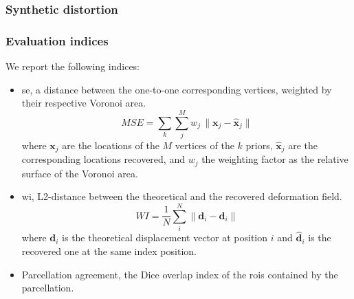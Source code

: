 \subsubsection{Synthetic distortion}
\label{sec:distortion}



\subsubsection{Evaluation indices} %
\label{sec:evaluation}
We report the following indices:
  \begin{itemize}
  \item \gls{se}, a distance between the one-to-one corresponding
    vertices, weighted by their respective Voronoi area.
    \begin{equation}
    MSE = \sum\limits_k \sum\limits_j^M w_j\,\| \mathbf{x}_j - \hat{\mathbf{x}}_j \|
    \end{equation}
    where $\mathbf{x}_j$ are the locations of the $M$ vertices of the $k$ priors,
    $\hat{\mathbf{x}}_j$ are the corresponding locations recovered, and $w_j$ the
    weighting factor as the relative surface of the Voronoi area.
  \item \gls{wi}, L2-distance between the theoretical and the recovered
    deformation field.
    \begin{equation}
    WI = \frac{1}{N} \sum\limits_i^N \| \mathbf{d}_i - \hat{\mathbf{d}}_i \|
    \end{equation}
    where $\mathbf{d}_i$ is the theoretical displacement vector at position $i$
    and $\hat{\mathbf{d}}_i$ is the recovered one at the same index position.
  \item Parcellation agreement, the Dice overlap index of the \glspl*{roi}
    contained by the parcellation.
  \end{itemize}
